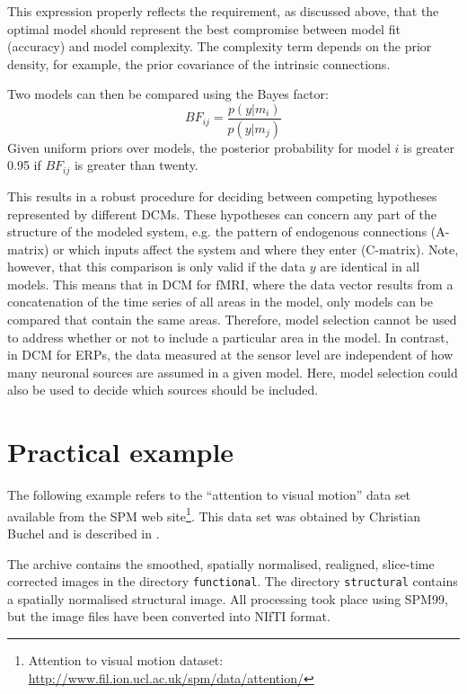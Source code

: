 This expression properly reflects the requirement, as discussed above, that the optimal model should represent the best compromise between model fit (accuracy) and model complexity.  The complexity term depends on the prior density, for example, the prior covariance of the intrinsic connections.  

Two models can then be compared using the Bayes factor:
\begin{equation}
BF_{ij} = \frac{p(y|m_i)}{p(y|m_j)}
\end{equation}
Given uniform priors over models, the posterior probability for model $i$ is greater 0.95 if $BF_{ij}$ is greater than twenty.

This results in a robust procedure for deciding between competing hypotheses represented by different DCMs. These hypotheses can concern any part of the structure of the modeled system, e.g. the pattern of endogenous connections (A-matrix) or which inputs affect the system and where they enter (C-matrix). Note, however, that this comparison is only valid if the data $y$ are identical in all models.  This means that in DCM for fMRI, where the data vector results from a concatenation of the time series of all areas in the model, only models can be compared that contain the same areas. Therefore, model selection cannot be used to address whether or not to include a particular area in the model.  In contrast, in DCM for ERPs, the data measured at the sensor level are independent of how many neuronal sources are assumed in a given model.  Here, model selection could also be used to decide which sources should be included.

\section{Practical example}

The following example refers to the ``attention to visual motion'' data set available from the SPM web site\footnote{Attention to visual motion dataset: \url{http://www.fil.ion.ucl.ac.uk/spm/data/attention/}}. This data set was obtained by Christian Buchel and is described in \cite{buchel97}.

The archive contains the smoothed, spatially normalised, realigned, slice-time corrected images in the directory \texttt{functional}. The directory \texttt{structural} contains a spatially normalised structural image. All processing took place using SPM99, but the image files have been converted into NIfTI format.

